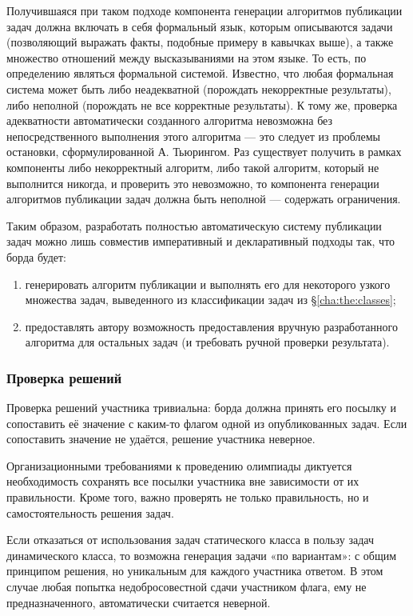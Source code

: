 Получившаяся при таком подходе компонента генерации алгоритмов публикации задач должна включать в себя формальный язык, которым описываются задачи (позволяющий выражать факты, подобные примеру в кавычках выше), а также множество отношений между высказываниями на этом языке. То есть, по определению являться формальной системой\cite{Vereshen08-3}. Известно, что любая формальная система может быть либо неадекватной (порождать некорректные результаты), либо неполной (порождать не все корректные результаты)\cite{Vereshen08-3}. К тому же, проверка адекватности автоматически созданного алгоритма невозможна без непосредственного выполнения этого алгоритма — это следует из проблемы остановки, сформулированной А. Тьюрингом\cite{Turing37}. Раз существует получить в рамках компоненты либо некорректный алгоритм, либо такой алгоритм, который не выполнится никогда, и проверить это невозможно, то компонента генерации алгоритмов публикации задач должна быть неполной — содержать ограничения.

Таким образом, разработать полностью автоматическую систему публикации задач можно лишь совместив императивный и декларативный подходы так, что борда будет:

\begin{enumerate}
\item генерировать алгоритм публикации и выполнять его для некоторого узкого множества задач, выведенного из классификации задач из §\ref{cha:the:classes};
\item предоставлять автору возможность предоставления вручную разработанного алгоритма для остальных задач (и требовать ручной проверки результата).
\end{enumerate}

\subsubsection{Проверка решений}

Проверка решений участника тривиальна: борда должна принять его посылку и сопоставить её значение с каким-то флагом одной из опубликованных задач. Если сопоставить значение не удаётся, решение участника неверное.

Организационными требованиями к проведению олимпиады диктуется необходимость сохранять все посылки участника вне зависимости от их правильности. Кроме того, важно проверять не только правильность, но и самостоятельность решения задач.

Если отказаться от использования задач статического класса в пользу задач динамического класса, то возможна генерация задачи «по вариантам»: с общим принципом решения, но уникальным для каждого участника ответом. В этом случае любая попытка недобросовестной сдачи участником флага, ему не предназначенного, автоматически считается неверной.


